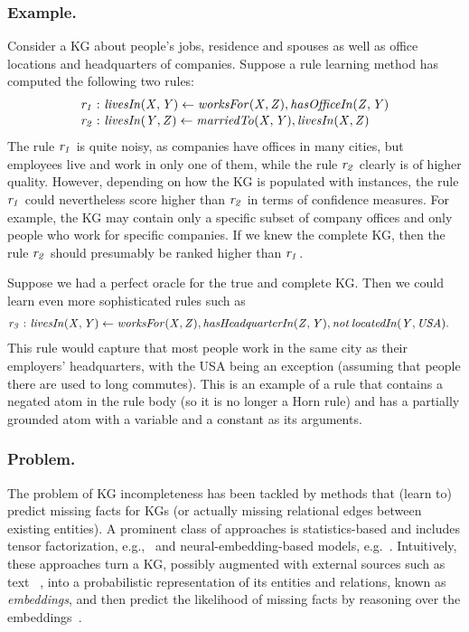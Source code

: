 \documentclass{llncs}
\begin{document}
%
\subsubsection{Example.}
Consider a KG about people's jobs, residence and
spouses as well as office locations and headquarters of companies.
Suppose a rule learning method has computed the following two rules:
{\small
\begin{align}
	\label{eq:ex-rule-1}
\mi{r_1 :\ }& \mi{livesIn(X,Y) \leftarrow worksFor(X,Z), hasOfficeIn(Z,Y)}\\[-.5ex]
	\label{eq:ex-rule-2}
\mi{r_2 :\ }& \mi{ livesIn(Y,Z) \leftarrow marriedTo(X,Y), livesIn(X,Z)}%
\end{align}}
The rule $\mathit{r_1}$ is quite noisy, as companies have offices in many cities, %
but employees live and work in only one of them, while
the rule $\mathit{r_2}$ clearly is of higher quality. 
However, depending on how the KG is populated with instances,
the rule $\mathit{r_1}$ could nevertheless score higher than $\mathit{r_2}$ in terms of confidence
measures. 
For example, the KG may contain only a specific subset of company offices
and only people who work for specific companies. 
If we knew the complete KG, then the rule $\mathit{r_2}$
should presumably be ranked higher than $\mathit{r_1}$.

Suppose we had a perfect oracle for the true and complete KG. Then
we could learn even more sophisticated rules such as
 {\small
 \begin{align*}
\mi{r_3 :\ } &\mi{livesIn(X,Y) \leftarrow worksFor(X,Z), hasHeadquarterIn(Z,Y), \mi{not}\, locatedIn(Y,USA)}.%
\end{align*}}
This rule would capture that most people work in the same city
as their employers' headquarters, with the USA being an exception
(assuming that people there are used to long commutes).
This is an example of a rule that contains a negated atom in
the rule body (so it is no longer a Horn rule) and has a partially
grounded atom with a variable and a constant as its arguments.


\subsubsection{Problem.}
The problem of  KG incompleteness has been tackled by methods that
(learn to) predict missing facts for KGs 
(or actually missing relational edges between
existing entities).
A prominent class of approaches is statistics-based and includes
tensor factorization, e.g.,~\cite{conf/icml/NickelTK11} and neural-embedding-based models, e.g.~\cite{Bordes:NIPS2013,DBLP:conf/aaai/NickelRP16}.
Intuitively, these approaches turn a KG, possibly augmented with
external sources such as 
text%
~\cite{DBLP:conf/ijcai/WangL16,DBLP:conf/aaai/0005HMZ17,DBLP:conf/esws/RingsquandlK0HL18}, 
into a probabilistic representation
of its entities and relations,
known as \emph{embeddings}, 
and then predict the likelihood of %
missing facts by reasoning over the embeddings~\cite{DBLP:journals/tkde/WangMWG17}.
\end{document}

